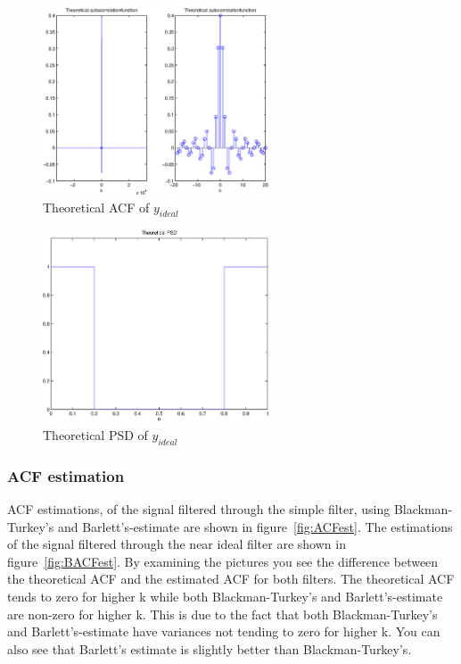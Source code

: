 \documentclass[10pt]{article}
\begin{document}
\begin{figure}[!hp]

    \begin{center}
      \includegraphics[width=0.6\textwidth]{BTheoACF}
    \caption{Theoretical ACF of $y_{ideal}$ \label{fig:TheoACFideal}}

    \end{center}

\end{figure}

\begin{figure}[!hp]

    \begin{center}
      \includegraphics[width=0.6\textwidth]{BTheoPSD}
    \caption{Theoretical PSD of $y_{ideal}$ \label{fig:TheoPSDideal}}
    \end{center}

\end{figure}

\clearpage

\subsubsection{ACF estimation}

ACF estimations, of the signal filtered through the simple filter, using Blackman-
Turkey’s and Barlett’s-estimate are shown in figure~\ref{fig:ACFest}. The estimations of the signal
filtered through the near ideal filter are shown in figure~\ref{fig:BACFest}.
By examining the pictures you see the difference between the theoretical ACF and
the estimated ACF for both filters. The theoretical ACF tends to zero for higher k
while both Blackman-Turkey’s and Barlett’s-estimate are non-zero for higher k. This is
due to the fact that both Blackman-Turkey’s and Barlett’s-estimate have variances not
tending to zero for higher k. You can also see that Barlett’s estimate is slightly better
than Blackman-Turkey’s. \\
\end{document}
